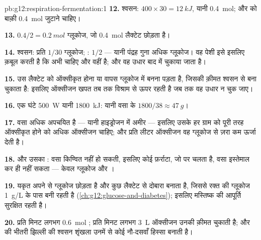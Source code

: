 \begin{solution}{pb:g12:respiration-fermentation:1}
\textbf{12.} श्वसन: $400 \times 30 = \qty{12}{kJ}$, यानी
\qty{0.4}{mol}; और  को बाक़ी \qty{0.4}{mol} जुटाने चाहिए।

\textbf{13.} $0.4/2 = \qty{0.2}{mol}$ ग्लूकोज, जो \qty{0.4}{mol}
लैक्टेट छोड़ता है।

\textbf{14.} श्वसन: प्रति  $1/30$ ग्लूकोज; : $1/2$
--- यानी पंद्रह गुना अधिक ग्लूकोज। वह पेशी इसे इसलिए क़बूल करती है कि 
अभी चाहिए और  वहीं है; और वह उधार बाद में चुकाया जाता है।

\textbf{15.} उस लैक्टेट को ऑक्सीकृत होना या वापस ग्लूकोज में बनना पड़ता है,
जिसकी क़ीमत श्वसन से बना  चुकाता है: इसलिए ऑक्सीजन खपत तब तक विश्राम से
ऊपर रहती है जब तक वह उधार न चुक जाए।

\textbf{16.} एक घंटे \qty{500}{W} यानी \qty{1800}{kJ}: यानी वसा के $1800/38
\approx \qty{47}{g}$।

\textbf{17.} वसा अधिक अपचयित है --- यानी हाइड्रोजन में अमीर --- इसलिए उसके
हर ग्राम को पूरी तरह ऑक्सीकृत होने को अधिक ऑक्सीजन चाहिए; और प्रति लीटर
ऑक्सीजन वह ग्लूकोज से ज़रा कम ऊर्जा देती है।

\textbf{18.}  और उसका : वसा किण्वित नहीं हो सकती, इसलिए
कोई फ़र्राटा, जो  पर चलता है, वसा इस्तेमाल कर ही नहीं सकता --- केवल
ग्लूकोज और ।

\textbf{19.} यकृत अपने  से ग्लूकोज छोड़ता है और कुछ लैक्टेट से
दोबारा बनाता है, जिससे रक्त की ग्लूकोज \qty{1}{g/L} के पास बनी रहती है
(\cref{ch:g12:glucose-and-diabetes}); इसलिए मस्तिष्क की आपूर्ति सुरक्षित
रहती है।

\textbf{20.} प्रति मिनट लगभग \qty{0.6}{mol} ; प्रति मिनट लगभग
\qty{3}{L} ऑक्सीजन उनकी क़ीमत चुकाती है; और  की भीतरी झिल्ली की
श्वसन शृंखला उनमें से कोई नौ-दसवाँ हिस्सा बनाती है।
\end{solution}
